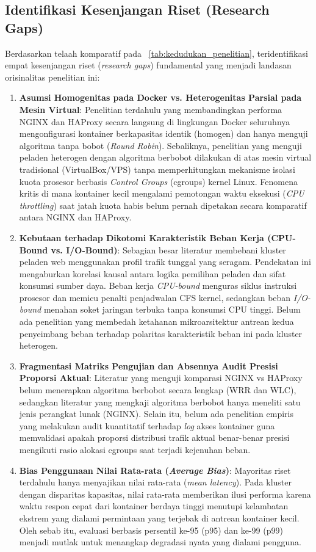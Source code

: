 \subsection{Identifikasi Kesenjangan Riset (Research Gaps)}
Berdasarkan telaah komparatif pada \tablename\ \ref{tab:kedudukan_penelitian}, teridentifikasi empat kesenjangan riset (\textit{research gaps}) fundamental yang menjadi landasan orisinalitas penelitian ini:
\begin{enumerate}
    \item \textbf{Asumsi Homogenitas pada Docker vs. Heterogenitas Parsial pada Mesin Virtual}: Penelitian terdahulu yang membandingkan performa NGINX dan HAProxy secara langsung di lingkungan Docker \citep{nurzaman2022analisis} seluruhnya mengonfigurasi kontainer berkapasitas identik (homogen) dan hanya menguji algoritma tanpa bobot (\textit{Round Robin}). Sebaliknya, penelitian yang menguji peladen heterogen dengan algoritma berbobot \citep{baeturohman2024analisis, rizqi2022analisis} dilakukan di atas mesin virtual tradisional (VirtualBox/VPS) tanpa memperhitungkan mekanisme isolasi kuota prosesor berbasis \textit{Control Groups} (cgroups) kernel Linux. Fenomena kritis di mana kontainer kecil mengalami pemotongan waktu eksekusi (\textit{CPU throttling}) saat jatah kuota habis belum pernah dipetakan secara komparatif antara NGINX dan HAProxy.
    \item \textbf{Kebutaan terhadap Dikotomi Karakteristik Beban Kerja (CPU-Bound vs. I/O-Bound)}: Sebagian besar literatur membebani kluster peladen web menggunakan profil trafik tunggal yang seragam. Pendekatan ini mengaburkan korelasi kausal antara logika pemilihan peladen dan sifat konsumsi sumber daya. Beban kerja \textit{CPU-bound} menguras siklus instruksi prosesor dan memicu penalti penjadwalan CFS kernel, sedangkan beban \textit{I/O-bound} menahan soket jaringan terbuka tanpa konsumsi CPU tinggi. Belum ada penelitian yang membedah ketahanan mikroarsitektur antrean kedua penyeimbang beban terhadap polaritas karakteristik beban ini pada kluster heterogen.
    \item \textbf{Fragmentasi Matriks Pengujian dan Absennya Audit Presisi Proporsi Aktual}: Literatur yang menguji komparasi NGINX vs HAProxy belum menerapkan algoritma berbobot secara lengkap (WRR dan WLC), sedangkan literatur yang mengkaji algoritma berbobot hanya meneliti satu jenis perangkat lunak (NGINX). Selain itu, belum ada penelitian empiris yang melakukan audit kuantitatif terhadap \textit{log} akses kontainer guna memvalidasi apakah proporsi distribusi trafik aktual benar-benar presisi mengikuti rasio alokasi cgroups saat terjadi kejenuhan beban.
    \item \textbf{Bias Penggunaan Nilai Rata-rata (\textit{Average Bias})}: Mayoritas riset terdahulu hanya menyajikan nilai rata-rata (\textit{mean latency}). Pada kluster dengan disparitas kapasitas, nilai rata-rata memberikan ilusi performa karena waktu respon cepat dari kontainer berdaya tinggi menutupi kelambatan ekstrem yang dialami permintaan yang terjebak di antrean kontainer kecil. Oleh sebab itu, evaluasi berbasis persentil ke-95 (p95) dan ke-99 (p99) menjadi mutlak untuk menangkap degradasi nyata yang dialami pengguna.
\end{enumerate}

